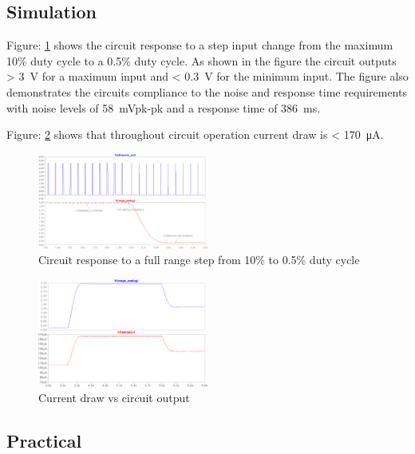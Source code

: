 \subsection{Simulation}

Figure: \ref{fig:sonicsen_sim_step} shows the circuit response to a step input change from the maximum 10\% duty cycle to a 0.5\% duty cycle. As shown in the figure the circuit outputs > \SI{3}{\volt} for a maximum input and < \SI{0.3}{\volt} for the minimum input. The figure also demonstrates the circuits compliance to the noise and response time requirements with noise levels of \SI{58}{\milli\volt}pk-pk and a response time of \SI{386}{\milli\second}.

Figure: \ref{fig:sonicsen_sim_cur} shows that throughout circuit operation current draw is < \SI{170}{\micro\ampere}.

\begin{figure}[H]
\centering
\includegraphics[width = 0.5\textwidth]{./Figures/SonicSens_RangeStep.png}
\caption{Circuit response to a full range step from 10\% to 0.5\% duty cycle}
\label{fig:sonicsen_sim_step}
\end{figure}

\begin{figure}[H]
\centering
\includegraphics[width = 0.5\textwidth]{./Figures/SonicSens_CurDraw.png}
\caption{Current draw vs circuit output}
\label{fig:sonicsen_sim_cur}
\end{figure}

\clearpage
\subsection{Practical}

